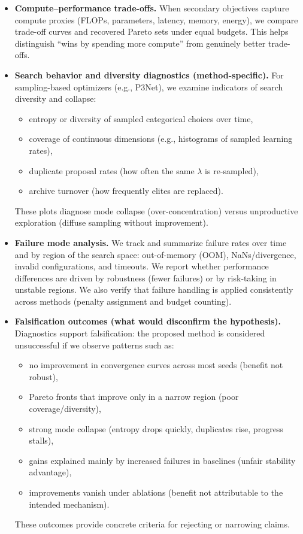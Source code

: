 \begin{itemize}
    \item \textbf{Compute--performance trade-offs.}
    When secondary objectives capture compute proxies (FLOPs, parameters, latency, memory, energy),
    we compare trade-off curves and recovered Pareto sets under equal budgets.
    This helps distinguish ``wins by spending more compute'' from genuinely better trade-offs.

    \item \textbf{Search behavior and diversity diagnostics (method-specific).}
    For sampling-based optimizers (e.g., P3Net), we examine indicators of search diversity and collapse:
    \begin{itemize}
        \item entropy or diversity of sampled categorical choices over time,
        \item coverage of continuous dimensions (e.g., histograms of sampled learning rates),
        \item duplicate proposal rates (how often the same \(\lambda\) is re-sampled),
        \item archive turnover (how frequently elites are replaced).
    \end{itemize}
    These plots diagnose mode collapse (over-concentration) versus unproductive exploration (diffuse sampling without improvement).

    \item \textbf{Failure mode analysis.}
    We track and summarize failure rates over time and by region of the search space:
    out-of-memory (OOM), NaNs/divergence, invalid configurations, and timeouts.
    We report whether performance differences are driven by robustness (fewer failures) or by risk-taking in unstable regions.
    We also verify that failure handling is applied consistently across methods (penalty assignment and budget counting).

    \item \textbf{Falsification outcomes (what would disconfirm the hypothesis).}
    Diagnostics support falsification: the proposed method is considered unsuccessful if we observe patterns such as:
    \begin{itemize}
        \item no improvement in convergence curves across most seeds (benefit not robust),
        \item Pareto fronts that improve only in a narrow region (poor coverage/diversity),
        \item strong mode collapse (entropy drops quickly, duplicates rise, progress stalls),
        \item gains explained mainly by increased failures in baselines (unfair stability advantage),
        \item improvements vanish under ablations (benefit not attributable to the intended mechanism).
    \end{itemize}
    These outcomes provide concrete criteria for rejecting or narrowing claims.
\end{itemize}
